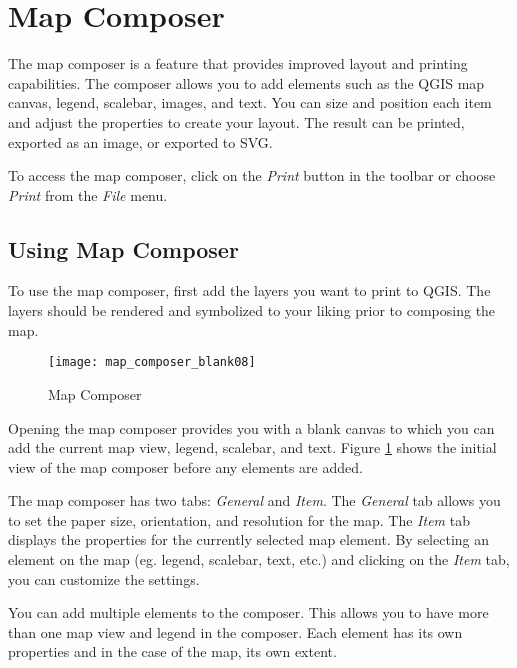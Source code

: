 
\section{Map Composer}\label{label_mapcomposer}

The map composer is a feature that provides improved layout and printing
capabilities. The composer allows you to add elements such as the QGIS map
canvas, legend, scalebar, images, and text. You can size and position each item and
adjust the properties to create your layout. The result can be printed,
exported as an image, or exported to SVG.

To access the map composer, click on the \textit{Print} button in the toolbar
or choose \textit{Print} from the \textit{File} menu.

\subsection{Using Map Composer}\label{label_usemapcomposer} 

To use the map composer, first add the layers you
want to print to QGIS. The layers should be rendered and symbolized to your
liking prior to composing the map. 

\begin{figure}[ht]
   \begin{center}
   \caption{Map Composer}\label{fig:map_composer_blank}\smallskip
   \texttt{[image: map\_composer\_blank08]}
\end{center}  
\end{figure}

Opening the map composer provides you with a blank canvas to which you can add
the current map view, legend, scalebar, and text. Figure
\ref{fig:map_composer_blank} shows the initial view of the map composer before
any elements are added.

The map composer has two tabs: \textit{General} and \textit{Item}. The
\textit{General} tab allows you to set the paper size, orientation, and
resolution for the map. The \textit{Item} tab displays the properties for the
currently selected map element. By selecting an element on the map (eg.
legend, scalebar, text, etc.) and clicking on the \textit{Item} tab, you can
customize the settings.

You can add multiple elements to the composer. This allows you to have more
than one map view and legend in the composer. Each element has its own
properties and in the case of the map, its own extent.

